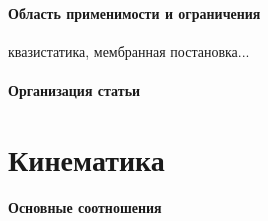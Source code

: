 

\paragraph{Область применимости и ограничения}
квазистатика, мембранная постановка...

\paragraph{Организация статьи}

\section{Кинематика}
\textbf{Основные соотношения}


